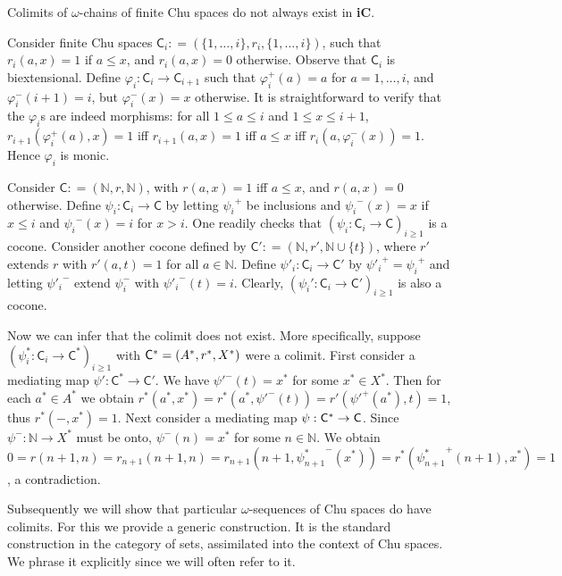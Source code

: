 \documentclass{LMCS}
\let\pf\proof
\let\epf\endproof
\begin{document}
\begin{thm}\label{non-existence}
Colimits of $\omega$-chains of finite Chu spaces do not always exist in  {\bf iC}.
\end{thm}

\pf Consider finite Chu spaces $\mathsf{C}_i : = (\{1, \ldots , i\}, r_i, \{1,
\ldots , i\})$, such that $r_i(a,x) = 1$ if $a\leq x$, and $r_i(a,x) =
0$ otherwise. Observe that $\mathsf{C}_i$ is biextensional.  Define
$\varphi_i: \mathsf{C}_i \to \mathsf{C}_{i+1}$ such that $\varphi^+_i(a) =a$
for $a=1,\ldots, i$, and $\varphi^-_i(i+1) =i$, but $\varphi^-_{i}(x)
=x$ otherwise.   It is
straightforward to verify that the $\varphi_i$s are indeed morphisms: for
all $1\leq a\leq i$ and $1\leq x\leq i+1$,
$r_{i+1}(\varphi^+_i(a),x)=1$ iff $r_{i+1}(a,x)=1$ iff $a\leq x$ iff
$r_{i}(a, \varphi^-_i(x))=1$. Hence $\varphi_i$ is monic.

Consider $\mathsf{C}: = (\mathbb{N}, r, \mathbb{N})$, with $r(a,x)= 1$
iff $a\leq x$, and $r(a,x) = 0$ otherwise. Define $\psi_i : \mathsf{C}_i
\to \mathsf{C}$ by letting ${\psi_i}^+$ be inclusions and ${\psi_i}^- (x)
= x$ if $x\leq i$ and ${\psi_i}^- (x) = i$ for $x>i$.  One readily
checks that $(\psi_i : \mathsf{C}_i\to \mathsf{C})_{i \geq 1}$ is a cocone.
Consider another cocone defined by $\mathsf{C}': = (\mathbb{N}, r',
\mathbb{N}\cup\{t\} )$, where $r'$ extends $r$ with $r'(a,t)= 1$ for
all $a\in \mathbb{N}$. Define $\psi'_i : \mathsf{C}_i\to \mathsf{C}'$ by
${\psi'_i}^+ = {\psi_i}^+ $ and letting ${\psi'_i}^-$ extend
$\psi_i^-$ with ${\psi'_i}^- (t) = i$.  Clearly, $(\psi_i' : \mathsf{C}_i
\to \mathsf{C}')_{i \geq 1}$ is also a cocone.

Now we can infer that the colimit does not exist. More specifically,
suppose $(\psi_i^*: \mathsf{C}_i \to \mathsf{C}^*)_{i \geq 1}$ with ${\sf
  C}^* = (A^*, r^*, X^*)$ were a colimit.  First consider a mediating
map $\psi' : \mathsf{C}^* \to \mathsf{C}'$.  We have ${\psi'}^- (t) = x^*$
for some $x^*\in X^*$. Then for each $a^*\in A^*$ we obtain $r^*(a^*,
x^*) = r^*(a^*, \psi'^- (t)) = r'(\psi'^+(a^*), t) = 1$, thus $r^*(-,
x^*) =1$. Next consider a mediating map $\psi : \mathsf{C}^* \to {\sf
  C}$.  Since $\psi^-: \mathbb{N}\to X^*$ must be onto, $\psi^- (n) =
x^*$ for some $n\in \mathbb{N}$. We obtain
$0 = r(n+1, n) = r_{n+1}(n+1,n) = r_{n+1}(n+1, {\psi^*_{n+1}}^- (x^*))
= r^*({\psi^*_{n+1}}^+(n+1),x^*)= 1$, a contradiction.
\epf

Subsequently we will show that particular $\omega$-sequences of Chu
spaces do have colimits. For this we provide a generic
construction. It is the standard construction in the category of sets,
assimilated into the context of Chu spaces. We phrase it explicitly
since we will often refer to it.
\end{document}

